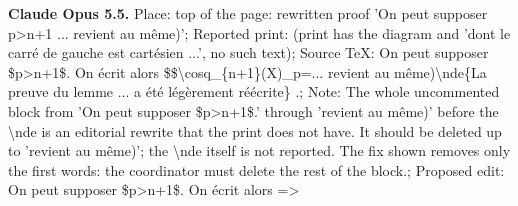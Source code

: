 \textbf{Claude Opus 5.5.} Place: top of the page: rewritten proof 'On peut supposer p>n+1 ... revient au même)'; Reported print: (print has the diagram and 'dont le carré de gauche est cartésien ...', no such text); Source TeX: On peut supposer \$p>n+1\$. On écrit alors \$\$\textbackslash{}cosq\_\{n+1\}(X)\_p=\allowbreak ... revient au même)\textbackslash{}nde\{La preuve du lemme ... a été légèrement réécrite\} .; Note: The whole uncommented block from 'On peut supposer \$p>n+1\$.' through 'revient au même)' before the \textbackslash{}nde is an editorial rewrite that the print does not have. It should be deleted up to 'revient au même)'; the \textbackslash{}nde itself is not reported. The fix shown removes only the first words: the coordinator must delete the rest of the block.; Proposed edit: On peut supposer \$p>n+1\$. On écrit alors =\allowbreak > \par
